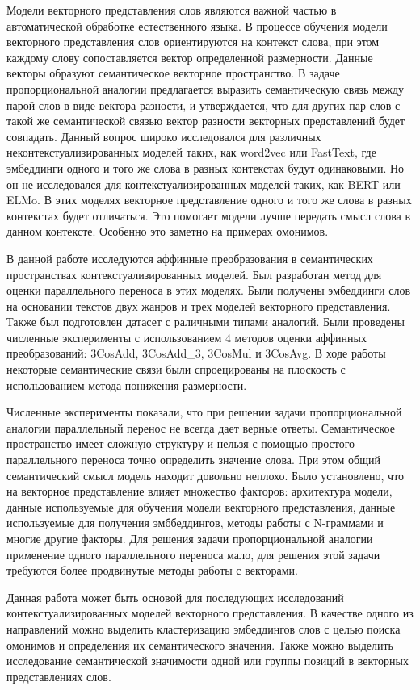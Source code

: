 \documentclass[a4paper,14pt]{article}
\begin{document}
Модели векторного представления слов являются важной частью в автоматической обработке естественного языка.
В процессе обучения модели векторного представления слов ориентируются на контекст слова, при этом каждому слову сопоставляется вектор определенной размерности.
Данные векторы образуют семантическое векторное пространство.
В задаче пропорциональной аналогии предлагается выразить семантическую связь между парой слов в виде вектора разности, и утверждается, что для других пар слов с такой же семантической связью вектор разности векторных представлений будет совпадать.
Данный вопрос широко исследовался для различных неконтекстуализированных моделей таких, как word2vec или FastText, где эмбеддинги одного и того же слова в разных контекстах будут одинаковыми.
Но он не исследовался для контекстуализированных моделей таких, как BERT или ELMo.
В этих моделях векторное представление одного и того же слова в разных контекстах будет отличаться.
Это помогает модели лучше передать смысл слова в данном контексте.
Особенно это заметно на примерах омонимов.

В данной работе исследуются аффинные преобразования в семантических пространствах контекстуализированных моделей.
Был разработан метод для оценки параллельного переноса в этих моделях.
Были получены эмбеддинги слов на основании текстов двух жанров и трех моделей векторного представления.
Также был подготовлен датасет с раличными типами аналогий.
Были проведены численные эксперименты с использованием 4 методов оценки аффинных преобразований: 3CosAdd, 3CosAdd\_3,  3CosMul и 3CosAvg.
В ходе работы некоторые семантические связи были спроецированы на плоскость с использованием метода понижения размерности.

Численные эксперименты показали, что при решении задачи пропорциональной аналогии параллельный перенос не всегда дает верные ответы.
Семантическое пространство имеет сложную структуру и нельзя с помощью простого параллельного переноса точно определить значение слова.
При этом общий семантический смысл модель находит довольно неплохо.
Было установлено, что на векторное представление влияет множество факторов: архитектура модели, данные используемые для обучения модели векторного представления, данные используемые для получения эмббеддингов, методы работы с N-граммами и многие другие факторы.
Для решения задачи пропорциональной аналогии применение одного параллельного переноса мало, для решения этой задачи требуются более продвинутые методы работы с векторами. 

Данная работа может быть основой для последующих исследований контекстуализированных моделей векторного представления.
В качестве одного из направлений можно выделить кластеризацию эмбеддингов слов с целью поиска омонимов и определения их семантического значения.
Также можно выделить исследование семантической значимости одной или группы позиций в векторных представлениях слов.
\end{document}
